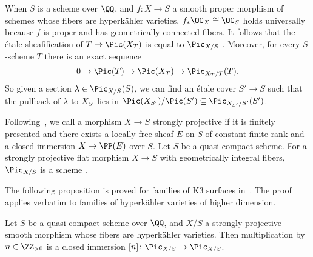 \begin{remark}\label{rem:etalecover}
When $S$ is a scheme over $\QQ$, and $f\colon X \rightarrow S$ a smooth proper morphism of schemes whose fibers are hyperk\"ahler varieties, $f_* \OO_X \cong \OO_S$ holds universally because $f$ is proper and has geometrically connected fibers. It follows that the \'etale sheafification of $T \mapsto \Pic(X_T)$ is equal to $\Pic_{{X}/{S}}$ \cite[pg.\ 257]{FGAex}. Moreover, for every $S$-scheme $T$ there is an exact sequence~\cite[Proposition 8.4]{BLR}
\begin{equation*}
    0 \rightarrow \Pic(T) \rightarrow \Pic(X_T) \rightarrow \Pic_{{X_T}/{T}}(T) \textrm{.}
\end{equation*}
So given a section $\lambda \in \Pic_{{X}/{S}}(S)$, we can find an \'etale cover $S' \rightarrow S$ such that the pullback of $\lambda$ to $X_{S'}$ lies in ${\Pic(X_{S'})}/{\Pic(S')} \subseteq \Pic_{{X_{S'}}/{S'}}(S')$.
\end{remark}

Following~\cite{BLR}, we call a morphism $X \rightarrow S$ strongly projective if it is finitely presented and there exists a locally free sheaf $E$ on $S$ of constant finite rank and a closed immersion $X \rightarrow \PP(E)$ over $S$. Let $S$ be a quasi-compact scheme. For a strongly projective flat morphism $X \rightarrow S$ with geometrically integral fibers, $\Pic_{{X}/{S}}$ is a scheme \cite[Theorem~8.2.5]{BLR}.

The following proposition is proved for families of K3 surfaces in~\cite[Lemma~3.1.6]{RizovModuli}. The proof applies verbatim to families of hyperk\"ahler varieties of higher dimension.

\begin{proposition}\label{prop:torsionfreepic}
Let $S$ be a quasi-compact scheme over $\QQ$, and $X/S$ a strongly projective smooth morphism whose fibers are hyperk\"ahler varieties. Then multiplication by $n \in \ZZ_{> 0}$ is a closed immersion $[n]\colon \Pic_{{X}/{S}} \rightarrow \Pic_{{X}/{S}}$.
\end{proposition}

